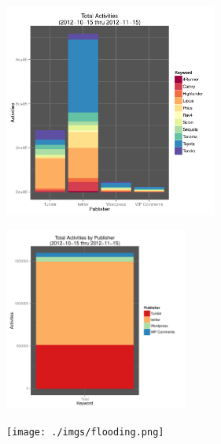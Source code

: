\documentclass{beamer}
\begin{document}
\begin{frame}
  \begin{center}
    \includegraphics[width=7cm]{./imgs/bars_tot.pdf}
  \end{center}
\end{frame}

\begin{frame}
  \begin{center}
    \includegraphics[width=6cm]{./imgs/bars_stacked.pdf}
  \end{center}
\end{frame}


\begin{frame}
  \begin{center}
    \texttt{[image: ./imgs/flooding.png]}
  \end{center}
\end{frame}


\begin{frame}
\begin{center}
\end{center}
\end{frame}
\end{document}
